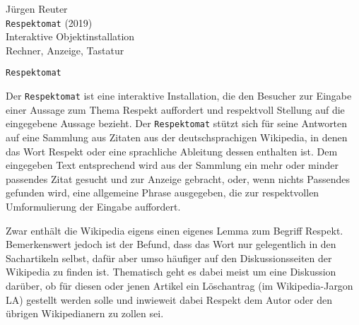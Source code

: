 \documentclass[12pt,utf8,a4paper]{article}
\newcommand{\respektomat}{{\tt Respektomat}}
\newcommand{\respekt}{{\frqq{}Respekt\flqq{}}}
\begin{document}
\pagestyle{empty}

{\raggedleft
  Jürgen Reuter\\
  \respektomat{} (2019)\\
  Interaktive Objektinstallation\\
  Rechner, Anzeige, Tastatur\\
}
\vspace{2em}

{\center\LARGE{\respektomat}\\}
\vspace{2em}

Der \respektomat{} ist eine interaktive Installation, die den Besucher
zur Eingabe einer Aussage zum Thema \respekt{} auffordert und
respektvoll Stellung auf die eingegebene Aussage bezieht.  Der
\respektomat{} stützt sich für seine Antworten auf eine Sammlung aus
Zitaten aus der deutschsprachigen Wikipedia, in denen das Wort
\respekt{} oder eine sprachliche Ableitung dessen enthalten ist.  Dem
eingegeben Text entsprechend wird aus der Sammlung ein mehr oder
minder passendes Zitat gesucht und zur Anzeige gebracht, oder, wenn
nichts Passendes gefunden wird, eine allgemeine Phrase ausgegeben, die
zur respektvollen Umformulierung der Eingabe auffordert.

Zwar enthält die Wikipedia eigens einen eigenes Lemma zum Begriff
\respekt.  Bemerkenswert jedoch ist der Befund, dass das Wort nur
gelegentlich in den Sachartikeln selbst, dafür aber umso häufiger auf
den Diskussionsseiten der Wikipedia zu finden ist.  Thematisch geht es
dabei meist um eine Diskussion darüber, ob für diesen oder jenen
Artikel ein Löschantrag (im Wikipedia-Jargon \frqq{}LA\flqq{})
gestellt werden solle und inwieweit dabei Respekt dem Autor oder den
übrigen Wikipedianern zu zollen sei.
\end{document}

